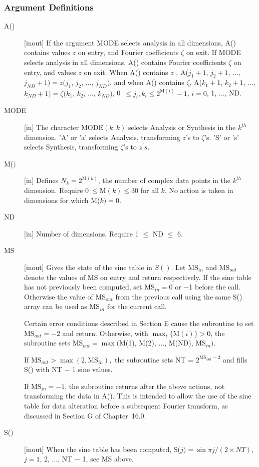 \documentclass[twoside]{MATH77}
\begin{document}
\subsubsection{Argument Definitions}

\begin{description}
\item[A()]  [inout] If the argument MODE selects analysis in all dimensions,
A() contains values $z$ on entry, and Fourier coefficients $\zeta $ on exit.
If MODE selects analysis in all dimensions, A() contains Fourier
coefficients $\zeta $ on entry, and values $z$ on exit. When A() contains $z$%
, A($j_1+1$, $j_2+1$, ..., $j_{ND}+1)=z(j_1$, $j_2$, ..., $j_{ND})$, and
when A() contains $\zeta $, A($k_1+1$, $k_2+1$, ..., $k_{ND}+1)=\zeta (k_1$,
$k_2$, ..., $k_{ND})$, 0\ $\leq j_i,k_i\leq 2^{\text{M}(i)}-1$, $i=0$, 1, ..., ND.

\item[MODE]  [in] The character MODE$(k{:}k)$ selects Analysis or Synthesis
in the $k^{th}$ dimension. 'A' or 'a' selects Analysis, transforming $%
z$'s to $\zeta $'s. 'S' or 's' selects Synthesis,
transforming $\zeta $'s to $z^{\prime }s.$

\item[M($)$]  [in] Defines $N_k=2^{\text{M}(k)}$, the number of complex data points
in the $k^{th}$ dimension. Require 0$\ \leq \text{M}(k)\leq 30$ for
all $k$. No action is taken in dimensions for which M($k)=0.$

\item[ND]  [in] Number of dimensions. Require 1 $\leq $ ND $\leq $ 6.

\item[MS]  [inout] Gives the state of the sine table in $S()$.  Let
$\text{MS}_{in}\text{ and MS}_{out}$ denote the values of MS on entry
and return respectively. If the sine table has not previously been
computed, set $\text{MS}_{in} = 0$ or $-$1 before the call. Otherwise
the value of $\text{MS}_{out}$ from the previous call using the same
S() array can be used as $\text{MS}_{in}$ for the current call.

Certain error conditions described in Section E cause the subroutine
to set $\text{MS}_{out} = -2$ and return.  Otherwise, with $\max _i
\{\text{M}(i)\} > 0$, the subroutine sets $\text{MS}_{out} = \max ($M(1),
M(2), ..., M(ND), $\text{MS}_{in}).$

If $\text{MS}_{out} > \max (2, \text{MS}_{in}),$ the subroutine sets
NT = $2^{\text{MS}_{out}-2}$ and fills S() with NT $-$ 1 sine values.

If $\text{MS}_{in}=-1$, the subroutine returns after the above
actions, not transforming the data in A().  This is intended to allow
the use of the sine table for data alteration before a subsequent Fourier
transform, as discussed in Section G of Chapter~16.0.

\item[S($)$]  [inout] When the sine table has been computed, S($j)=\sin \pi
j/(2\times {\textstyle NT})$, $j=1$, 2, ..., NT $-$ 1, see MS above.
\end{description}
\end{document}
